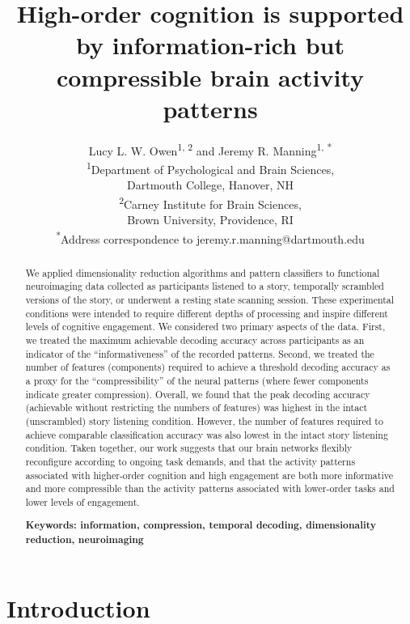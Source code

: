 \documentclass[english, 11pt]{article}
\title{High-order cognition is supported by information-rich but compressible brain activity patterns}
\author{Lucy L. W. Owen\textsuperscript{1, 2} and Jeremy R. Manning\textsuperscript{1,
*}\\\textsuperscript{1}Department of Psychological and Brain Sciences,\\Dartmouth College,
Hanover, NH\\[0.1cm]\textsuperscript{2}Carney Institute for Brain Sciences,\\Brown University,
Providence, RI\\[0.1cm] \textsuperscript{*}Address correspondence to
jeremy.r.manning@dartmouth.edu}
\begin{document}
\maketitle


\begin{abstract} 

We applied dimensionality reduction algorithms and pattern classifiers to
functional neuroimaging data collected as participants listened to a story,
temporally scrambled versions of the story, or underwent a resting state
scanning session. These experimental conditions were intended to require
different depths of processing and inspire different levels of cognitive
engagement. We considered two primary aspects of the data. First, we treated
the maximum achievable decoding accuracy across participants as an indicator of
the ``informativeness'' of the recorded patterns. Second, we treated the number
of features (components) required to achieve a threshold decoding accuracy as a
proxy for the ``compressibility'' of the neural patterns (where fewer
components indicate greater compression). Overall, we found that the peak
decoding accuracy (achievable without restricting the numbers of features)
was highest in the intact (unscrambled) story listening condition.  However, the
number of features required to achieve comparable classification accuracy
was also lowest in the intact story listening condition.  Taken together, our work
suggests that our brain networks flexibly reconfigure according to ongoing task
demands, and that the activity patterns associated with higher-order cognition
and high engagement are both more informative and more compressible than the
activity patterns associated with lower-order tasks and lower levels of
engagement.

\bigskip
\noindent
\textbf{Keywords: information, compression, temporal decoding, dimensionality
reduction, neuroimaging}

\end{abstract}

\doublespacing

\section*{Introduction}
\end{document}
